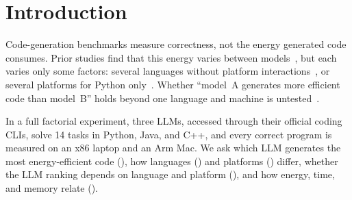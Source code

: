 \section{Introduction}
\label{sec:introduction}

Code-generation benchmarks measure correctness, not the energy generated code consumes.
Prior studies find that this energy varies between
models~\cite{solovyeva2025powerhungry,islam2025evaluating,apsan2026whereare}, but each
varies only some factors: several languages without platform
interactions~\cite{solovyeva2025powerhungry,rekhi2026prompting}, or several platforms for
Python only~\cite{apsan2026whereare}. Whether ``model~A generates more efficient code than
model~B'' holds beyond one language and machine is untested~\cite{masthanali2026slr}.

In a full factorial experiment, three LLMs, accessed through their official coding CLIs,
solve 14 tasks in Python, Java, and C++, and every correct program is measured on an
x86 laptop and an Arm Mac. We ask which LLM generates the most energy-efficient code
(), how languages () and platforms () differ, whether the LLM ranking
depends on language and platform (), and how energy, time, and memory relate
().
